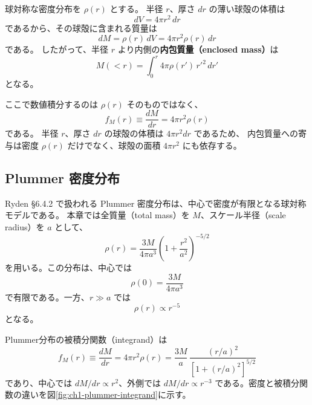 球対称な密度分布を $\rho(r)$ とする。
半径 $r$、厚さ $dr$ の薄い球殻の体積は
\begin{equation}
 dV = 4\pi r^2\,dr
\label{eq:ch1-shell-volume}
\end{equation}
であるから、その球殻に含まれる質量は
\begin{equation}
 dM = \rho(r)\,dV
 = 4\pi r^2\rho(r)\,dr
\label{eq:ch1-shell-mass}
\end{equation}
である。
したがって、半径 $r$ より内側の\textbf{内包質量（enclosed mass）}は
\begin{equation}
 \boxed{
 M(<r)=\int_0^r 4\pi\rho(r')\,r'^2\,dr'
 }
\label{eq:ch1-enclosed-mass}
\end{equation}
となる。

ここで数値積分するのは $\rho(r)$ そのものではなく、
\begin{equation}
 f_M(r)\equiv \frac{dM}{dr}=4\pi r^2\rho(r)
\label{eq:ch1-mass-integrand}
\end{equation}
である。
半径 $r$、厚さ $dr$ の球殻の体積は $4\pi r^2dr$ であるため、
内包質量への寄与は密度 $\rho(r)$ だけでなく、球殻の面積 $4\pi r^2$ にも依存する。

\subsection{Plummer 密度分布}

Ryden §6.4.2 で扱われる Plummer 密度分布は、中心で密度が有限となる球対称モデルである\cite{ryden2025}。
本章では全質量（total mass）を $M$、スケール半径（scale radius）を $a$ として、
\begin{equation}
 \rho(r)=\frac{3M}{4\pi a^3}
 \left(1+\frac{r^2}{a^2}\right)^{-5/2}
\label{eq:ch1-plummer-density}
\end{equation}
を用いる。この分布は、中心では
\begin{equation}
 \rho(0)=\frac{3M}{4\pi a^3}
\label{eq:ch1-plummer-center-density}
\end{equation}
で有限である。一方、$r\gg a$ では
\begin{equation}
 \rho(r)\propto r^{-5}
\label{eq:ch1-plummer-outer-density}
\end{equation}
となる。

Plummer分布の被積分関数（integrand）は
\begin{equation}
 f_M(r) \equiv \frac{dM}{dr}
 =4\pi r^2\rho(r)
 =\frac{3M}{a}\,
 \frac{(r/a)^2}{\left[1+(r/a)^2\right]^{5/2}}
\label{eq:ch1-plummer-integrand}
\end{equation}
であり、中心では $dM/dr\propto r^2$、外側では $dM/dr\propto r^{-3}$ である。密度と被積分関数の違いを図\ref{fig:ch1-plummer-integrand}に示す。

